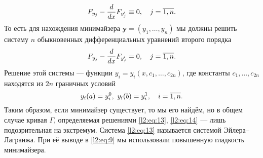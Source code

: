\documentclass[12pt,a4paper,openany,fleqn]{book}
\newcommand{\der}[2]{\ensuremath{\frac{d#1}{d#2}}}
\theoremstyle{definition}
\begin{document}
\begin{equation}
	\label{l2:eq:12}
	\hfill F_{y_j}-\der{}{x}F_{y'_j}\equiv0,\quad j=\overline{1,n}.\hfill
\end{equation}
То есть для нахождения минимайзера $\bm{y}=(y_1,\ldots,y_n)$ мы должны решить систему $n$ обыкновенных дифференциальных уравнений второго порядка
\begin{equation}
	\label{l2:eq:13}
	\hfill F_{y_j}-\der{}{x}F_{y'_j}=0,\quad j=\overline{1,n}.\hfill
\end{equation}
Решение этой системы --- функции $y_i=y_i(x,c_1,\ldots,c_{2n})$, где константы $c_1,\ldots,c_{2n}$ находятся из $2n$ граничных условий
\begin{equation}
	\label{l2:eq:14}
	\hfill y_i(a)=y_i^0,\ y_i(b)=y_i^1,\quad i=\overline{1,n}.\hfill
\end{equation}
Таким образом, если минимайзер существует, то мы его найдём, но в общем случае кривая $\Gamma$, определяемая решениями \eqref{l2:eq:13}, \eqref{l2:eq:14} --- лишь подозрительная на экстремум. Система \eqref{l2:eq:13} называется системой Эйлера--Лагранжа. При её выводе в \eqref{l2:eq:9} мы использовали повышенную гладкость минимайзера.
\end{document}
